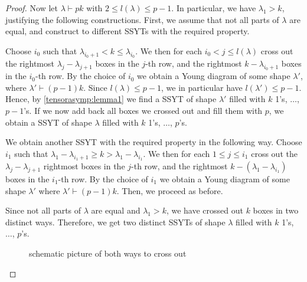 \documentclass[a4paper]{amsart}
\begin{document}
\begin{proof}
	Now let $\lambda\vdash pk$ with $2\leq l(\lambda)\leq p-1$.
	In particular, we have $\lambda_1>k$, justifying the following constructions.
	First, we assume that not all parts of $\lambda$ are equal,
	and construct to different SSYTs with the required property.
	
	Choose $i_0$ such that $\lambda_{i_0+1}<k\leq\lambda_{i_0}$.
	We then for each $i_0<j\leq l(\lambda)$ cross out the rightmost $\lambda_{j}-\lambda_{j+1}$ boxes in the $j$-th row,
	and the rightmost $k-\lambda_{i_0+1}$ boxes in the $i_0$-th row.
	By the choice of $i_0$
	we obtain a Young diagram of some shape $\lambda'$, where $\lambda'\vdash (p-1)k$.
	Since $l(\lambda)\leq p-1$, we in particular have $l(\lambda')\leq p-1$.
	Hence, by \cref{tensorasymp:lemma1} we find a SSYT of shape $\lambda'$ filled with $k$ 1's, $\ldots$, $p-1$'s.
	If we now add back all boxes we crossed out and fill them with $p$, we obtain a SSYT of shape $\lambda$ filled with $k$ 1's, $\ldots$, $p$'s.
	
	We obtain another SSYT with the required property in the following way.
	Choose $i_1$ such that $\lambda_1-\lambda_{i_1+1}\geq k>\lambda_1-\lambda_{i_1}$.
	We then for each $1\leq j\leq i_1$ cross out the $\lambda_j-\lambda_{j+1}$ rightmost boxes in the $j$-th row,
	and the rightmost $k-(\lambda_1-\lambda_{i_1})$ boxes in the $i_1$-th row.
	By the choice of $i_1$ we obtain a Young diagram of some shape $\lambda'$ where $\lambda'\vdash (p-1)k$.
	Then, we proceed as before.

	Since not all parts of $\lambda$ are equal and $\lambda_1>k$,
	we have crossed out $k$ boxes in two distinct ways.
	Therefore, we get two distinct SSYTs of shape $\lambda$ filled with $k$ 1's, $\ldots$, $p$'s.

	\begin{figure}[H]
		\begin{center}
		\caption*{schematic picture of both ways to cross out}
		\end{center}
	\end{figure}


\end{proof}
\end{document}
